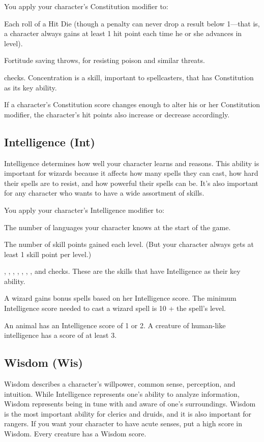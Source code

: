 You apply your character's Constitution modifier to:
\begin{itemize*}
\item Each roll of a Hit Die (though a penalty can never drop a result below 1---that is, a character always gains at least 1 hit point each time he or she advances in level).
\item Fortitude saving throws, for resisting poison and similar threats.
\item {} checks. Concentration is a skill, important to spellcasters, that has Constitution as its key ability.
\end{itemize*}

If a character's Constitution score changes enough to alter his or her Constitution modifier, the character's hit points also increase or decrease accordingly.

\subsection{Intelligence (Int)}
Intelligence determines how well your character learns and reasons. This ability is important for wizards because it affects how many spells they can cast, how hard their spells are to resist, and how powerful their spells can be. It's also important for any character who wants to have a wide assortment of skills.

You apply your character's Intelligence modifier to:
\begin{itemize*}
\item The number of languages your character knows at the start of the game.
\item The number of skill points gained each level. (But your character always gets at least 1 skill point per level.)
\item {}, , , , , , , and  checks. These are the skills that have Intelligence as their key ability.
\end{itemize*}

A wizard gains bonus spells based on her Intelligence score. The minimum Intelligence score needed to cast a wizard spell is 10 + the spell's level.

An animal has an Intelligence score of 1 or 2. A creature of human-like intelligence has a score of at least 3.

\subsection{Wisdom (Wis)}
Wisdom describes a character's willpower, common sense, perception, and intuition. While Intelligence represents one's ability to analyze information, Wisdom represents being in tune with and aware of one's surroundings. Wisdom is the most important ability for clerics and druids, and it is also important for rangers. If you want your character to have acute senses, put a high score in Wisdom. Every creature has a Wisdom score.

